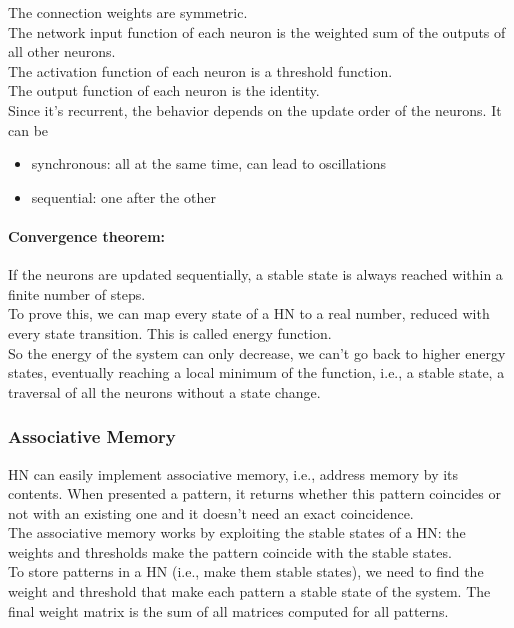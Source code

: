 The connection weights are symmetric. \\
The network input function of each neuron is the weighted sum of the outputs of all other neurons. \\
The activation function of each neuron is a threshold function.\\
The output function of each neuron is the identity.\\

Since it's recurrent, the behavior depends on the update order of the neurons. It can be
\begin{itemize}
	\item synchronous: all at the same time, can lead to oscillations
	\item sequential: one after the other
\end{itemize}

\paragraph{Convergence theorem:} If the neurons are updated sequentially, a stable state is always reached within a finite number of steps.\\
To prove this, we can map every state of a HN to a real number, reduced with every state transition. This is called energy function.\\
So the energy of the system can only decrease, we can't go back to higher energy states, eventually reaching a local minimum of the function, i.e., a stable state, a traversal of all the neurons without a state change.

\subsubsection{Associative Memory}
HN can easily implement associative memory, i.e., address memory by its contents. When presented a pattern, it returns whether this pattern coincides or not with an existing one and it doesn't need an exact coincidence.\\

The associative memory works by exploiting the stable states of a HN: the weights and thresholds make the pattern coincide with the stable states.\\

To store patterns in a HN (i.e., make them stable states), we need to find the weight and threshold that make each pattern a stable state of the system. The final weight matrix is the sum of all matrices computed for all patterns.\\

